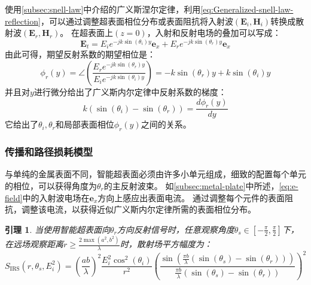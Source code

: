 \documentclass[supercite]{HustGraduPaper}
\newtheorem{lemma}{\indent 引理}[section]
\begin{document}
使用\autoref{subsec:snell-law}中介绍的广义斯涅尔定律，利用\autoref{eq:Generalized-snell-law-reflection}，可以通过调整超表面相位分布或表面阻抗将入射波$\left(\mathbf{E}_{i}, \mathbf{H}_{i}\right)$转换成散射波$\left(\mathbf{E}_{r}, \mathbf{H}_{r}\right)$。
在超表面上$(z = 0)$，入射和反射电场的叠加可以写成\cite{Asadchy_2016}：
\begin{equation}
	\mathbf{E}_{t}=E_{i} e^{-j k \sin \left(\theta_{i}\right) y} \boldsymbol{e}_{x}+E_{r} e^{-j k \sin \left(\theta_{r}\right) y} \boldsymbol{e}_{x}
\end{equation}
由此可得，期望反射系数的期望相位是：
\begin{equation}
	\phi_{r}(y)=\angle\left(\frac{E_{r} e^{-j k \sin \left(\theta_{r}\right) y}}{E_{i} e^{-j k \sin \left(\theta_{i}\right) y}}\right)=-k \sin \left(\theta_{r}\right) y+k \sin \left(\theta_{i}\right) y
\end{equation}
并且对$y$进行微分给出了广义斯内尔定律中反射系数的梯度：
\begin{equation}
	k\left(\sin \left(\theta_{i}\right)-\sin \left(\theta_{r}\right)\right)=\frac{d \phi_{r}(y)}{d y}
\end{equation}
它给出了$\theta_i,\theta_r$和局部表面相位$\phi_{r}(y)$之间的关系。

\subsubsection{传播和路径损耗模型}

与单纯的金属表面不同，智能超表面必须由许多小单元组成，细致的配置每个单元的相位，可以获得角度为$\theta_r$的主反射波束。
如\autoref{subsec:metal-plate}中所述，\autoref{eq:e-field}中的入射波电场在$\boldsymbol{e}_{x}$方向上感应出表面电流。
通过调整每个元件的表面阻抗，调整该电流，以获得近似广义斯内尔定律所需的表面相位分布。

\begin{lemma}
	当使用智能超表面向$\theta_r$方向反射信号时，任意观察角度$\theta_{s} \in\left[-\frac{\pi}{2}, \frac{\pi}{2}\right]$下，在远场观察距离$r \geq \frac{2 \max \left(a^{2}, b^{2}\right)}{\lambda}$时，散射场平方幅度为：
	\begin{equation}
		S_{\mathrm{IRS}}\left(r, \theta_{s}, E_{i}^{2}\right) =\left(\frac{a b}{\lambda}\right)^{2} \frac{E_{i}^{2} \cos ^{2}\left(\theta_{i}\right)}{r^{2}}\left(\frac{\sin \left(\frac{\pi b}{\lambda}\left(\sin \left(\theta_{s}\right)-\sin \left(\theta_{r}\right)\right)\right)}{\frac{\pi b}{\lambda}\left(\sin \left(\theta_{s}\right)-\sin \left(\theta_{r}\right)\right)}\right)^{2}
	\end{equation}
\end{lemma}
\end{document}

